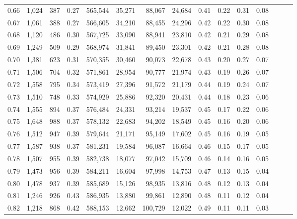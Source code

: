 \begin{tabular}{rrrrrrrrrrrrrrr}
0.66 &   1,024 &    387 &  0.27 &  565,544 &   35,271 &   88,067 &   24,684 &  0.41 &  0.22 &  0.31 &      0.08 \\
0.67 &   1,061 &    388 &  0.27 &  566,605 &   34,210 &   88,455 &   24,296 &  0.42 &  0.22 &  0.30 &      0.08 \\
0.68 &   1,120 &    486 &  0.30 &  567,725 &   33,090 &   88,941 &   23,810 &  0.42 &  0.21 &  0.29 &      0.08 \\
0.69 &   1,249 &    509 &  0.29 &  568,974 &   31,841 &   89,450 &   23,301 &  0.42 &  0.21 &  0.28 &      0.08 \\
0.70 &   1,381 &    623 &  0.31 &  570,355 &   30,460 &   90,073 &   22,678 &  0.43 &  0.20 &  0.27 &      0.07 \\
0.71 &   1,506 &    704 &  0.32 &  571,861 &   28,954 &   90,777 &   21,974 &  0.43 &  0.19 &  0.26 &      0.07 \\
0.72 &   1,558 &    795 &  0.34 &  573,419 &   27,396 &   91,572 &   21,179 &  0.44 &  0.19 &  0.24 &      0.07 \\
0.73 &   1,510 &    748 &  0.33 &  574,929 &   25,886 &   92,320 &   20,431 &  0.44 &  0.18 &  0.23 &      0.06 \\
0.74 &   1,555 &    894 &  0.37 &  576,484 &   24,331 &   93,214 &   19,537 &  0.45 &  0.17 &  0.22 &      0.06 \\
0.75 &   1,648 &    988 &  0.37 &  578,132 &   22,683 &   94,202 &   18,549 &  0.45 &  0.16 &  0.20 &      0.06 \\
0.76 &   1,512 &    947 &  0.39 &  579,644 &   21,171 &   95,149 &   17,602 &  0.45 &  0.16 &  0.19 &      0.05 \\
0.77 &   1,587 &    938 &  0.37 &  581,231 &   19,584 &   96,087 &   16,664 &  0.46 &  0.15 &  0.17 &      0.05 \\
0.78 &   1,507 &    955 &  0.39 &  582,738 &   18,077 &   97,042 &   15,709 &  0.46 &  0.14 &  0.16 &      0.05 \\
0.79 &   1,473 &    956 &  0.39 &  584,211 &   16,604 &   97,998 &   14,753 &  0.47 &  0.13 &  0.15 &      0.04 \\
0.80 &   1,478 &    937 &  0.39 &  585,689 &   15,126 &   98,935 &   13,816 &  0.48 &  0.12 &  0.13 &      0.04 \\
0.81 &   1,246 &    926 &  0.43 &  586,935 &   13,880 &   99,861 &   12,890 &  0.48 &  0.11 &  0.12 &      0.04 \\
0.82 &   1,218 &    868 &  0.42 &  588,153 &   12,662 &  100,729 &   12,022 &  0.49 &  0.11 &  0.11 &      0.03 \\

\end{tabular}
